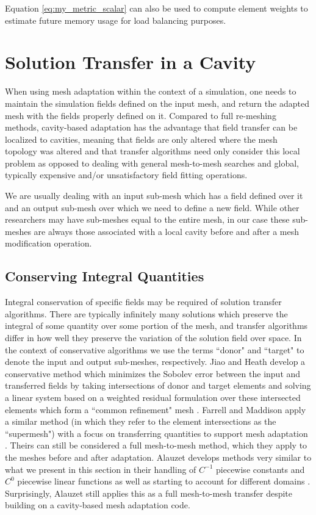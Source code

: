 Equation \ref{eq:my_metric_scalar} can also be used to compute element weights
to estimate future memory usage for load balancing purposes.

\section{Solution Transfer in a Cavity}
\label{sec:transfer}

When using mesh adaptation within the context of a simulation,
one needs to maintain the simulation fields defined on the input mesh,
and return the adapted mesh with the fields properly defined on it.
Compared to full re-meshing methods, cavity-based adaptation has the
advantage that field transfer can be localized to cavities, meaning
that fields are only altered where the mesh topology was altered and
that transfer algorithms need only consider this local problem
as opposed to dealing with general mesh-to-mesh searches and
global, typically expensive and/or unsatisfactory field fitting operations.

We are usually dealing with an input sub-mesh which has a field defined
over it and an output sub-mesh over which we need to define a new
field.
While other researchers may have sub-meshes equal to the entire mesh,
in our case these sub-meshes are always those associated with
a local cavity before and after a mesh modification operation.

\subsection{Conserving Integral Quantities}
\label{sec:conserve}

Integral conservation of specific fields may be required of
solution transfer algorithms.
There are typically infinitely many solutions which preserve the
integral of some quantity over some portion of the mesh, and
transfer algorithms differ in how well they preserve the variation
of the solution field over space.
In the context of conservative algorithms we use the terms
``donor" and ``target" to denote the input and output sub-meshes,
respectively.
Jiao and Heath develop a conservative method which minimizes
the Sobolev error between the input and transferred fields
by taking intersections of donor and target elements and
solving a linear system based on a weighted residual formulation
over these intersected elements which form a ``common refinement" mesh
\cite{jiao2004common}.
Farrell and Maddison apply a similar method (in which they refer
to the element intersections as the ``supermesh") with a focus
on transferring quantities to support mesh adaptation \cite{farrell2009conservative}.
Theirs can still be considered a full mesh-to-mesh method, which
they apply to the meshes before and after adaptation.
Alauzet develops methods very similar to what we present in this
section in their handling of $C^{-1}$
piecewise constants and $C^0$ piecewise linear functions as well
as starting to account for different domains \cite{alauzet2016parallel}.
Surprisingly, Alauzet still applies this as a full mesh-to-mesh transfer
despite building on a cavity-based mesh adaptation code.

